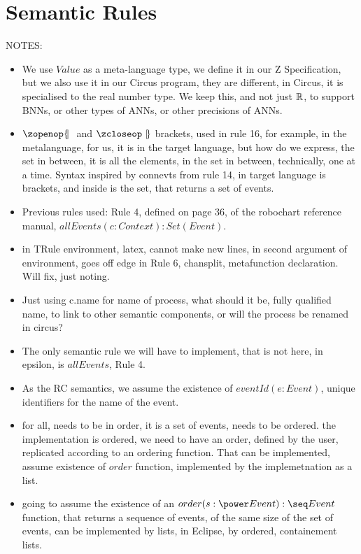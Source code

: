 \documentclass{article}
\begin{document}
\section{Semantic Rules}
NOTES:
\begin{itemize} 
  \item We use $Value$ as a meta-language type, we define it in our Z Specification, but we also use it in our Circus program, they are different, in Circus, it is specialised to the real number type. We keep this, and not just $\mathbb{R}$, to support BNNs, or other types of ANNs, or other precisions of ANNs. 
  \item $\lchanset$ and $\rchanset$ brackets, used in rule 16, for example, in the metalanguage, for us, it is in the target language, but how do we express, the set in between, it is all the elements, in the set in between, technically, one at a time. Syntax inspired by connevts from rule 14, in target language is brackets, and inside is the set, that returns a set of events. 
  \item Previous rules used: Rule 4, defined on page 36, of the robochart reference manual, $allEvents(c : Context) : Set(Event)$. 
  \item in TRule environment, latex, cannot make new lines, in second argument of environment, goes off edge in Rule 6, chansplit, metafunction declaration. Will fix, just noting. 
  \item Just using c.name for name of process, what should it be, fully qualified name, to link to other semantic components, or will the process be renamed in circus? 
  \item The only semantic rule we will have to implement, that is not here, in epsilon, is $allEvents$, Rule 4.
  \item As the RC semantics, we assume the existence of $eventId(e: Event)$, unique identifiers for the name of the event. 
  \item for all, needs to be in order, it is a set of events, needs to be ordered. the implementation is ordered, we need to have an order, defined by the user, replicated according to an ordering function. That can be implemented, assume existence of $order$ function, implemented by the implemetnation as a list. 
  \item going to assume the existence of an $order(s : \power Event): \seq Event$ function, that returns a sequence of events, of the same size of the set of events, can be implemented by lists, in Eclipse, by ordered, containement lists. 
\end{itemize} 
\end{document}
